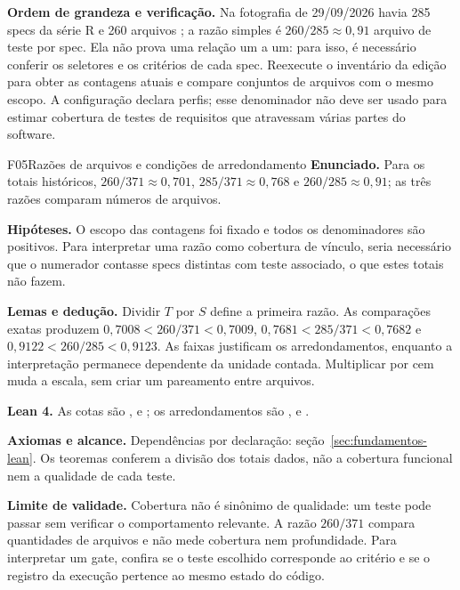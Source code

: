 \begin{resultado}
\textbf{Ordem de grandeza e verificação.} Na fotografia de 29/09/2026 havia
285 specs da série R e 260 arquivos ; a razão simples é
$260/285 \approx 0{,}91$ arquivo de teste por spec. Ela não prova uma relação
um a um: para isso, é necessário conferir os seletores e os critérios de cada
spec. Reexecute o inventário da edição para obter as contagens atuais e
compare conjuntos de arquivos com o mesmo escopo. A configuração declara
\CoreAgentCount{} perfis; esse denominador não deve ser usado para estimar
cobertura de testes de requisitos que atravessam várias partes do software.
\end{resultado}

\begin{formalizacao}{F05}{Razões de arquivos e condições de arredondamento}
\textbf{Enunciado.} Para os totais históricos, $260/371\approx0{,}701$, $285/371\approx0{,}768$ e $260/285\approx0{,}91$; as três razões comparam números de arquivos.

\textbf{Hipóteses.} O escopo das contagens foi fixado e todos os denominadores são positivos. Para interpretar uma razão como cobertura de vínculo, seria necessário que o numerador contasse specs distintas com teste associado, o que estes totais não fazem.

\textbf{Lemas e dedução.} Dividir $T$ por $S$ define a primeira razão. As comparações exatas produzem $0{,}7008<260/371<0{,}7009$, $0{,}7681<285/371<0{,}7682$ e $0{,}9122<260/285<0{,}9123$. As faixas justificam os arredondamentos, enquanto a interpretação permanece dependente da unidade contada. Multiplicar por cem muda a escala, sem criar um pareamento entre arquivos.

\textbf{Lean 4.} As cotas são ,  e ; os arredondamentos são ,  e .

\textbf{Axiomas e alcance.} Dependências por declaração: seção~\ref{sec:fundamentos-lean}. Os teoremas conferem a divisão dos totais dados, não a cobertura funcional nem a qualidade de cada teste.
\end{formalizacao}

\begin{aviso}
\textbf{Limite de validade.} Cobertura não é sinônimo de qualidade: um teste pode
passar sem verificar o comportamento relevante. A razão $260/371$ compara
quantidades de arquivos e não mede cobertura nem profundidade. Para interpretar
um gate, confira se o teste escolhido corresponde ao critério e se o registro da
execução pertence ao mesmo estado do código.
\end{aviso}

